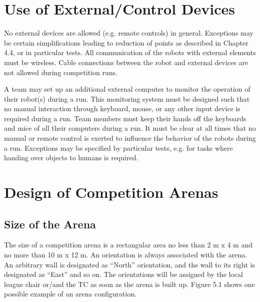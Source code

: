 
\section{Use of External/Control Devices}
No external devices are allowed (e.g. remote controls) in general. Exceptions may be certain simplifications leading to reduction of points as described in Chapter 4.4, or in particular tests. All communication of the robots with external elements must be wireless. Cable connections between the robot and external devices are not allowed during competition runs.
\par
A team may set up an additional external computer to monitor the operation of their robot(s) during a run. This monitoring system must be designed such that no manual interaction through keyboard, mouse, or any other input device is required during a run. Team members must keep their hands off the keyboards and mice of all their computers during a run.
It must be clear at all times that no manual or remote control is exerted to influence the behavior of the robots during a run. Exceptions may be specified by particular tests, e.g. for tasks where handing over objects to humans is required.

\section{Design of Competition Arenas}
\label{sec:ArenaDesign}
\subsection{Size of the Arena}

The size of a competition arena is a rectangular area no less than 2 m x 4 m and no more than 10 m x 12 m.
An orientation is always associated with the arena. An arbitrary wall is designated as “North” orientation, and the wall to its right is designated as “East” and so on. The orientations will be assigned by the local league chair or/and the TC as soon as the arena is built up. Figure 5.1 shows one possible example of an arena configuration.

